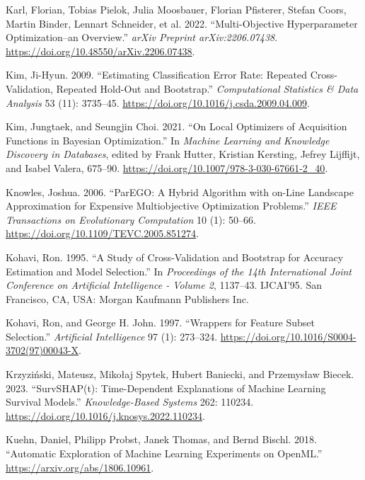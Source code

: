 \begin{CSLReferences}{1}{0}
\leavevmode{}%
Karl, Florian, Tobias Pielok, Julia Moosbauer, Florian Pfisterer, Stefan
Coors, Martin Binder, Lennart Schneider, et al. 2022. {``Multi-Objective
Hyperparameter Optimization--an Overview.''} \emph{arXiv Preprint
arXiv:2206.07438}. \url{https://doi.org/10.48550/arXiv.2206.07438}.

\leavevmode{}%
Kim, Ji-Hyun. 2009. {``Estimating Classification Error Rate: Repeated
Cross-Validation, Repeated Hold-Out and Bootstrap.''}
\emph{Computational Statistics \& Data Analysis} 53 (11): 3735--45.
\url{https://doi.org/10.1016/j.csda.2009.04.009}.

\leavevmode{}%
Kim, Jungtaek, and Seungjin Choi. 2021. {``On Local Optimizers of
Acquisition Functions in Bayesian Optimization.''} In \emph{Machine
Learning and Knowledge Discovery in Databases}, edited by Frank Hutter,
Kristian Kersting, Jefrey Lijffijt, and Isabel Valera, 675--90.
\url{https://doi.org/10.1007/978-3-030-67661-2_40}.

\leavevmode{}%
Knowles, Joshua. 2006. {``ParEGO: A Hybrid Algorithm with on-Line
Landscape Approximation for Expensive Multiobjective Optimization
Problems.''} \emph{IEEE Transactions on Evolutionary Computation} 10
(1): 50--66. \url{https://doi.org/10.1109/TEVC.2005.851274}.

\leavevmode{}%
Kohavi, Ron. 1995. {``A Study of Cross-Validation and Bootstrap for
Accuracy Estimation and Model Selection.''} In \emph{Proceedings of the
14th International Joint Conference on {Artificial} Intelligence -
{Volume} 2}, 1137--43. {IJCAI}'95. {San Francisco, CA, USA}: {Morgan
Kaufmann Publishers Inc.}

\leavevmode{}%
Kohavi, Ron, and George H. John. 1997. {``Wrappers for Feature Subset
Selection.''} \emph{Artificial Intelligence} 97 (1): 273--324.
\url{https://doi.org/10.1016/S0004-3702(97)00043-X}.

\leavevmode{}%
Krzyziński, Mateusz, Mikołaj Spytek, Hubert Baniecki, and Przemysław
Biecek. 2023. {``{SurvSHAP(t)}: Time-Dependent Explanations of Machine
Learning Survival Models.''} \emph{Knowledge-Based Systems} 262: 110234.
\url{https://doi.org/10.1016/j.knosys.2022.110234}.

\leavevmode{}%
Kuehn, Daniel, Philipp Probst, Janek Thomas, and Bernd Bischl. 2018.
{``Automatic Exploration of Machine Learning Experiments on OpenML.''}
\url{https://arxiv.org/abs/1806.10961}.


\end{CSLReferences}
